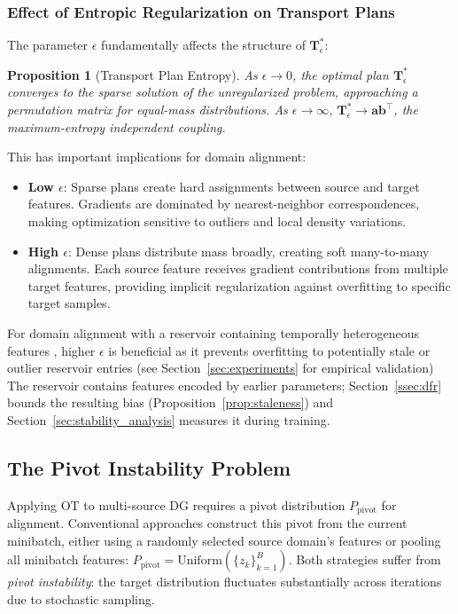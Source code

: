 \documentclass[preprint,12pt]{elsarticle}
\newtheorem{proposition}[theorem]{Proposition}
\providecommand{\DIFadd}[1]{{\protect\color{blue} \sf #1}} %
\providecommand{\DIFdel}[1]{{\protect\color{red} \scriptsize #1}} %
\providecommand{\DIFaddbegin}{} %
\providecommand{\DIFaddend}{} %
\providecommand{\DIFdelbegin}{} %
\providecommand{\DIFdelend}{} %
\newcommand{\DIFscaledelfig}{0.5}
\newlength{\DIFdelgraphicswidth} %
\newlength{\DIFdelgraphicsheight} %
\newcommand{\DIFaddincludegraphics}[2][]{{\color{blue}\fbox{\DIFOincludegraphics[#1]{#2}}}} %
\newcommand{\DIFdelincludegraphics}[2][]{%
\sbox{\DIFdelgraphicsbox}{\DIFOincludegraphics[#1]{#2}}%
\settoboxwidth{\DIFdelgraphicswidth}{\DIFdelgraphicsbox} %
\settoboxtotalheight{\DIFdelgraphicsheight}{\DIFdelgraphicsbox} %
\scalebox{\DIFscaledelfig}{%
\parbox[b]{\DIFdelgraphicswidth}{\usebox{\DIFdelgraphicsbox}\\[-\baselineskip] \rule{\DIFdelgraphicswidth}{0em}}\llap{\resizebox{\DIFdelgraphicswidth}{\DIFdelgraphicsheight}{%
\setlength{\unitlength}{\DIFdelgraphicswidth}%
\begin{picture}(1,1)%
\thicklines\linethickness{2pt} %
{\color[rgb]{1,0,0}\put(0,0){\framebox(1,1){}}}%
{\color[rgb]{1,0,0}\put(0,0){\line( 1,1){1}}}%
{\color[rgb]{1,0,0}\put(0,1){\line(1,-1){1}}}%
\end{picture}%
}\hspace*{3pt}}} %
} %
\DeclareRobustCommand{\DIFaddbegin}{\DIFOaddbegin \let\includegraphics\DIFaddincludegraphics} %
\DeclareRobustCommand{\DIFaddend}{\DIFOaddend \let\includegraphics\DIFOincludegraphics} %
\DeclareRobustCommand{\DIFdelbegin}{\DIFOdelbegin \let\includegraphics\DIFdelincludegraphics} %
\DeclareRobustCommand{\DIFdelend}{\DIFOaddend \let\includegraphics\DIFOincludegraphics} %
\begin{document}
\subsubsection{Effect of Entropic Regularization on Transport Plans}

The parameter $\epsilon$ fundamentally affects the structure of $\mathbf{T}^*_\epsilon$:

\begin{proposition}[Transport Plan Entropy]
\label{prop:entropy}
As $\epsilon \to 0$, the optimal plan $\mathbf{T}^*_\epsilon$ converges to the sparse solution of the unregularized problem, approaching a permutation matrix for equal-mass distributions. As $\epsilon \to \infty$, $\mathbf{T}^*_\epsilon \to \mathbf{a}\mathbf{b}^\top$, the maximum-entropy independent coupling.
\end{proposition}

This has important implications for domain alignment:
\begin{itemize}
    \item \textbf{Low $\epsilon$}: Sparse plans create hard assignments between source and target features. Gradients are dominated by nearest-neighbor correspondences, making optimization sensitive to outliers and local density variations.
    \item \textbf{High $\epsilon$}: Dense plans distribute mass broadly, creating soft many-to-many alignments. Each source feature receives gradient contributions from multiple target features, providing implicit regularization against overfitting to specific target samples.
\end{itemize}

\DIFdelbegin \DIFdel{For domain alignment with a reservoir containing temporally heterogeneous features , higher $\epsilon$ is beneficial as it prevents overfitting to potentially stale or outlier reservoir entries (see Section~\ref{sec:experiments} for empirical validation) }\DIFdelend \DIFaddbegin \DIFadd{The reservoir contains features encoded by earlier parameters; Section~\ref{ssec:dfr} bounds the resulting bias (Proposition~\ref{prop:staleness}) and Section~\ref{sec:stability_analysis} measures it during training}\DIFaddend .

\subsection{The Pivot Instability Problem}
\label{ssec:pivot_instability}

Applying OT to multi-source DG requires a pivot distribution $P_{\text{pivot}}$ for alignment. Conventional approaches construct this pivot from the current minibatch, either using a randomly selected source domain's features or pooling all minibatch features: $P_{\text{pivot}} = \text{Uniform}(\{z_k\}_{k=1}^{B})$. Both strategies suffer from \textit{pivot instability}: the target distribution fluctuates substantially across iterations due to stochastic sampling.
\end{document}
